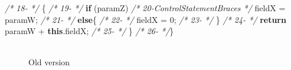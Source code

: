\documentclass[
]{article}
\newenvironment{Shaded}{\begin{snugshade}}{\end{snugshade}}
\newcommand{\CommentTok}[1]{\textcolor[rgb]{0.56,0.35,0.01}{\textit{#1}}}
\newcommand{\DecValTok}[1]{\textcolor[rgb]{0.00,0.00,0.81}{#1}}
\newcommand{\FunctionTok}[1]{\textcolor[rgb]{0.00,0.00,0.00}{#1}}
\newcommand{\KeywordTok}[1]{\textcolor[rgb]{0.13,0.29,0.53}{\textbf{#1}}}
\newcommand{\NormalTok}[1]{#1}
\begin{document}
\begin{Shaded}
\begin{Highlighting}[]
\CommentTok{/* 18-                                   */}\NormalTok{    \{}
\CommentTok{/* 19-                                   */}        \KeywordTok{if}\NormalTok{ (paramZ)}
\CommentTok{/* 20-ControlStatementBraces             */}\NormalTok{            fieldX = paramW;}
\CommentTok{/* 21-                                   */}        \KeywordTok{else}\NormalTok{\{}
\CommentTok{/* 22-                                   */}\NormalTok{            fieldX = }\DecValTok{0}\NormalTok{;}
\CommentTok{/* 23-                                   */}\NormalTok{     \}}
\CommentTok{/* 24-                                   */}        \KeywordTok{return}\NormalTok{ paramW + }\KeywordTok{this}\NormalTok{.}\FunctionTok{fieldX}\NormalTok{;}
\CommentTok{/* 25-                                   */}\NormalTok{     \}}
\CommentTok{/* 26-                                   */}\NormalTok{\}  }
\end{Highlighting}
\end{Shaded}

\normalsize

\begin{figure}
\centering
\includegraphics{figures/fake.png}
\caption{Old version \label{old_simple_code}}
\end{figure}

\newpage

\small
\end{document}
